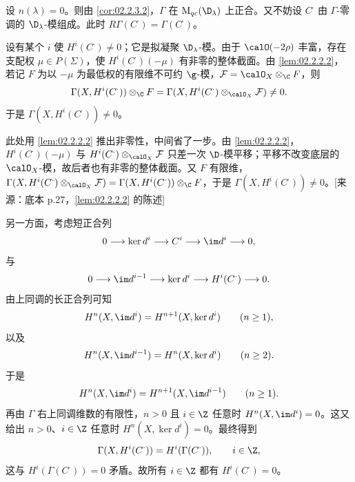 设 $n(\lambda)=0$。则由 \ref{cor:02.2.3.2}，$\Gamma$ 在 $\mathrm{M}_{qc}(\D_\lambda)$ 上正合。又不妨设 $C^\cdot$ 由 $\Gamma$-零调的 $\D_\lambda$-模组成。此时 $R\Gamma(C^\cdot)=\Gamma(C^\cdot)$。

设有某个 $i$ 使 $H^i(C^\cdot)\neq0$；它是拟凝聚 $\D_\lambda$-模。由于 $\calO(-2\rho)$ 丰富，存在支配权 $\mu\in P(\Sigma)$，使 $H^i(C^\cdot)(-\mu)$ 有非零的整体截面。由 \ref{lem:02.2.2.2}，若记 $F$ 为以 $-\mu$ 为最低权的有限维不可约 $\g$-模，$\mathcal{F}=\calO_X\otimes_\C F$，则
\[
\Gamma(X,H^i(C^\cdot))\otimes_\C F=\Gamma(X,H^i(C^\cdot)\otimes_{\calO_X}\mathcal{F})\neq 0 .
\]
于是 $\Gamma(X,H^i(C^\cdot))\neq 0$。
\begin{annote}
此处用 \ref{lem:02.2.2.2} 推出非零性，中间省了一步。由 \ref{lem:02.2.2.2}，$H^i(C^\cdot)(-\mu)$ 与 $H^i(C^\cdot)\otimes_{\calO_X}\mathcal{F}$ 只差一次 $\D$-模平移；平移不改变底层的 $\calO_X$-模，故后者也有非零的整体截面。又 $F$ 有限维，$\Gamma(X,H^i(C^\cdot)\otimes_{\calO_X}\mathcal{F})=\Gamma(X,H^i(C^\cdot))\otimes_\C F$，于是 $\Gamma(X,H^i(C^\cdot))\neq0$。[来源：底本 p.27，\ref{lem:02.2.2.2} 的陈述]
\end{annote}

另一方面，考虑短正合列
\[
0\longrightarrow\ker d^i\longrightarrow C^i\longrightarrow\im d^i\longrightarrow 0,
\]
与
\[
0\longrightarrow\im d^{i-1}\longrightarrow\ker d^i\longrightarrow H^i(C^\cdot)\longrightarrow 0.
\]
由上同调的长正合列可知
\[
H^n(X,\im d^i)=H^{n+1}(X,\ker d^i)\qquad (n\ge 1),
\]
以及
\[
H^n(X,\im d^{i-1})=H^n(X,\ker d^i)\qquad (n\ge 2).
\]
于是
\[
H^n(X,\im d^i)=H^{n+1}(X,\im d^{i-1})\qquad (n\ge 1).
\]
再由 $\Gamma$ 右上同调维数的有限性，$n>0$ 且 $i\in\Z$ 任意时 $H^n(X,\im d^i)=0$。这又给出 $n>0$、$i\in\Z$ 任意时 $H^n(X,\ker d^i)=0$。最终得到
\[
\Gamma(X,H^i(C^\cdot))=H^i(\Gamma(C^\cdot)),\qquad i\in\Z,
\]
这与 $H^i(\Gamma(C^\cdot))=0$ 矛盾。故所有 $i\in\Z$ 都有 $H^i(C^\cdot)=0$。

